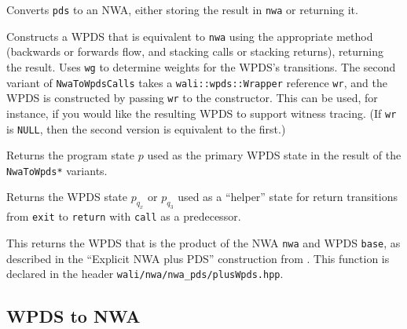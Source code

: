 \begin{functionlist}
    Converts \texttt{pds} to an NWA, either storing the result in
    \texttt{nwa} or returning it.

    Constructs a WPDS that is equivalent to \texttt{nwa} using the
    appropriate method (backwards or forwards flow, and stacking calls or
    stacking returns), returning the result. Uses \texttt{wg} to determine
    weights for the WPDS's transitions. The second variant of
    \texttt{NwaToWpdsCalls} takes a \texttt{wali::wpds::Wrapper} reference
    \texttt{wr}, and the WPDS is constructed by passing \texttt{wr} to the
    constructor. This can be used, for instance, if you would like the
    resulting WPDS to support witness tracing. (If \texttt{wr} is
    \texttt{NULL}, then the second version is equivalent to the first.)

    Returns the program state $p$ used as the primary WPDS state in the
    result of the \texttt{NwaToWpds*} variants.

    Returns the WPDS state $p_{q_x}$ or $p_{q_3}$ used as a ``helper'' state
    for return transitions from \texttt{exit} to \texttt{return} with
    \texttt{call} as a predecessor.

    This returns the WPDS that is the
    product of the NWA \texttt{nwa} and WPDS \texttt{base}, as described in the ``Explicit
    NWA plus PDS'' construction from \cite[\S6]{advancedquerying}. This
    function is declared in the header
    \texttt{wali/nwa/nwa\_pds/plusWpds.hpp}.
\end{functionlist}


\subsection{WPDS to NWA}
\label{Se:WpdsToNwa}


